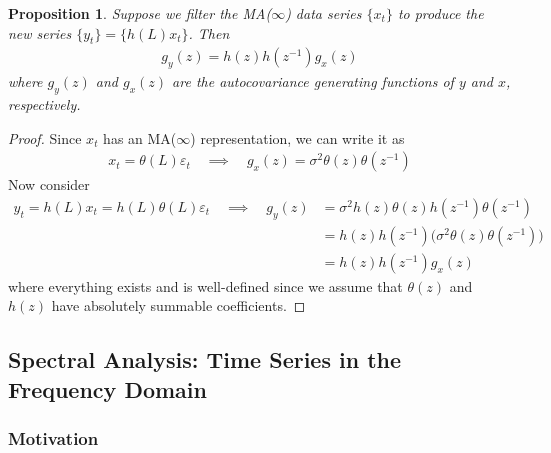 \documentclass[12pt]{article}
\theoremstyle{plain}
\newtheorem{prop}[thm]{Proposition}
\theoremstyle{definition}
\theoremstyle{remark}
\begin{document}
\begin{prop}
Suppose we filter the MA($\infty$) data series $\{x_t\}$ to produce the
new series $\{y_t\} = \{h(L)x_t\}$. Then
\begin{align*}
  g_y(z) = h(z)h(z^{-1})g_x(z)
\end{align*}
where $g_y(z)$ and $g_x(z)$ are the autocovariance generating functions
of $y$ and $x$, respectively.
\end{prop}
\begin{proof}
Since $x_t$ has an MA($\infty$) representation, we can write it as
\begin{align*}
  x_t = \theta(L)\varepsilon_t
  \quad\implies\quad
  g_x(z) = \sigma^2 \theta(z)\theta(z^{-1})
\end{align*}
Now consider
\begin{align*}
  y_t = h(L)x_t = h(L)\theta(L)\varepsilon_t
  \quad\implies\quad
  g_y(z) &= \sigma^2 h(z)\theta(z)h(z^{-1})\theta(z^{-1})
  \\
  &= h(z)h(z^{-1})\big(\sigma^2 \theta(z)\theta(z^{-1})\big)
  \\
  &= h(z)h(z^{-1})g_x(z)
\end{align*}
where everything exists and is well-defined since we assume that
$\theta(z)$ and $h(z)$ have absolutely summable coefficients.
\end{proof}



\clearpage
\subsection{Spectral Analysis: Time Series in the Frequency Domain}


\subsubsection{Motivation}
\end{document}
